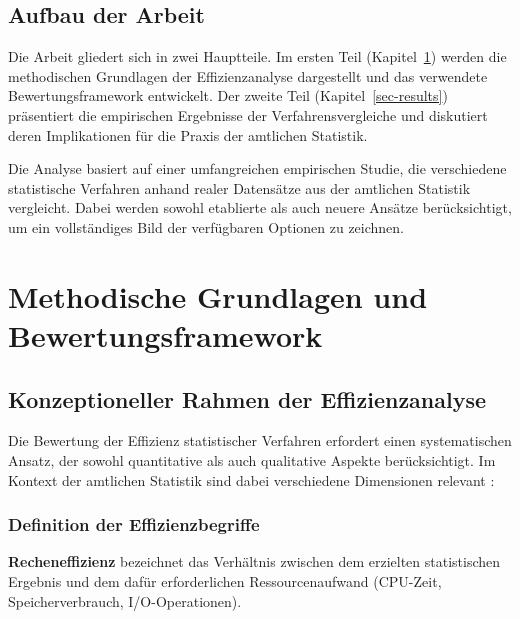 \documentclass[
  ngerman,
  10pt,
  letterpaper,
]{book}
\begin{document}
\section*{Aufbau der Arbeit}\label{aufbau-der-arbeit}


Die Arbeit gliedert sich in zwei Hauptteile. Im ersten Teil
(Kapitel~\ref{sec-methodology}) werden die methodischen Grundlagen der
Effizienzanalyse dargestellt und das verwendete Bewertungsframework
entwickelt. Der zweite Teil (Kapitel~\ref{sec-results}) präsentiert die
empirischen Ergebnisse der Verfahrensvergleiche und diskutiert deren
Implikationen für die Praxis der amtlichen Statistik.

Die Analyse basiert auf einer umfangreichen empirischen Studie, die
verschiedene statistische Verfahren anhand realer Datensätze aus der
amtlichen Statistik vergleicht. Dabei werden sowohl etablierte als auch
neuere Ansätze berücksichtigt, um ein vollständiges Bild der verfügbaren
Optionen zu zeichnen.


\chapter{Methodische Grundlagen und
Bewertungsframework}\label{sec-methodology}

\section{Konzeptioneller Rahmen der
Effizienzanalyse}\label{konzeptioneller-rahmen-der-effizienzanalyse}

Die Bewertung der Effizienz statistischer Verfahren erfordert einen
systematischen Ansatz, der sowohl quantitative als auch qualitative
Aspekte berücksichtigt. Im Kontext der amtlichen Statistik sind dabei
verschiedene Dimensionen relevant \autocite{eurostat2021quality}:

\subsection{Definition der
Effizienzbegriffe}\label{definition-der-effizienzbegriffe}

\textbf{Recheneffizienz} bezeichnet das Verhältnis zwischen dem
erzielten statistischen Ergebnis und dem dafür erforderlichen
Ressourcenaufwand (CPU-Zeit, Speicherverbrauch, I/O-Operationen).
\end{document}
